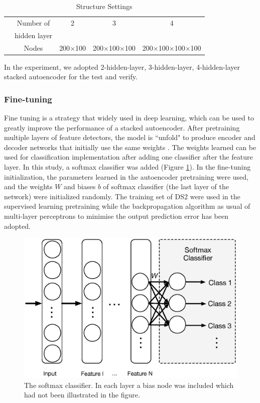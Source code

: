 \documentclass[journal]{IEEEtran}
\begin{document}
\begin{table}[!htbp]
\begin{center}
\begin{threeparttable}
\caption{Structure Settings}
\label{Table 5}
\begin{tabular}{ccccc}
\hline
&Number of & 2 & 3 &  4\\
&hidden layer& & &\\
\hline
& Nodes & 200$\times$100 & 200$\times$100$\times$100&200$\times$100$\times$100$\times$100 \\

\hline
\end{tabular}
\end{threeparttable}
\end{center}
\end{table}

In the experiment, we adopted 2-hidden-layer, 3-hidden-layer, 4-hidden-layer stacked autoencoder for the test and verify. 

\subsubsection{Fine-tuning}
Fine tuning is a strategy that widely used in deep learning, which can be used to greatly improve the performance of a stacked autoencoder. 
After pretraining multiple layers of feature detectors, the model is ``unfold" to produce encoder and decoder networks that initially use the same weights \cite{hinton}. 
The weights learned can be used for classification implementation after adding one classifier after the feature layer. In this study, a softmax classifier was added (Figure \ref{figure3}). 
In the fine-tuning initialization, the parameters learned in the autoencoder pretraining were used, and the weights $W$ and biases $b$  of softmax classifier (the last layer of the network) were initialized randomly. 
The training set of DS2 were used in the supervised learning pretraining while the backpropagation algorithm as usual of multi-layer perceptrons to minimise the output prediction error has been adopted.

\begin{figure}[]
\centering
\includegraphics[width=3 in]{eps/Figure3.eps}
\caption{The softmax classifier. In each layer a bias node was included which had not been illustrated in the figure. }
\label{figure3}
\end{figure}
\end{document}
